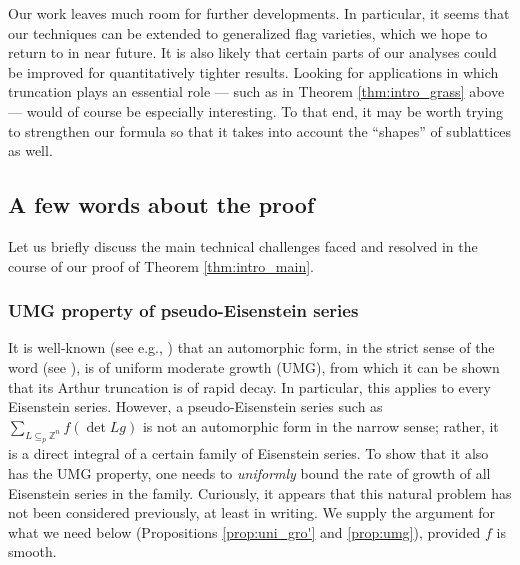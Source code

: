 \documentclass[11pt]{amsart}
\numberwithin{theorem}{section}
\numberwithin{equation}{section}
\theoremstyle{remark}
\theoremstyle{definition}
\newcommand{\Z}{\mathbb{Z}}
\begin{document}
Our work leaves much room for further developments. In particular, it seems that our techniques can be extended to generalized flag varieties, which we hope to return to in near future. It is also likely that certain parts of our analyses could be improved for quantitatively tighter results. Looking for applications in which truncation plays an essential role --- such as in Theorem \ref{thm:intro_grass} above --- would of course be especially interesting. To that end, it may be worth trying to strengthen our formula so that it takes into account the ``shapes'' of sublattices as well.

\subsection{A few words about the proof}

Let us briefly discuss the main technical challenges faced and resolved in the course of our proof of Theorem \ref{thm:intro_main}.

\subsubsection*{UMG property of pseudo-Eisenstein series}

It is well-known (see e.g., \cite[I.2]{MW95}) that an automorphic form, in the strict sense of the word (see \cite[I.2.17]{MW95}), is of uniform moderate growth (UMG), from which it can be shown that its Arthur truncation is of rapid decay. In particular, this applies to every Eisenstein series. However, a pseudo-Eisenstein series such as $\sum_{L \subseteq_p \Z^n} f(\det Lg)$ is not an automorphic form in the narrow sense; rather, it is a direct integral of a certain family of Eisenstein series. To show that it also has the UMG property, one needs to \emph{uniformly} bound the rate of growth of all Eisenstein series in the family. Curiously, it appears that this natural problem has not been considered previously, at least in writing. We supply the argument for what we need below (Propositions \ref{prop:uni_gro'} and \ref{prop:umg}), provided $f$ is smooth.

\end{document}
